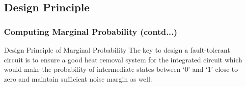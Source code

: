 \documentclass{beamer}
\begin{document}
\subsection{Design Principle}
\begin{frame}
\frametitle{Computing Marginal Probability (contd...)}
\begin{flushleft}
\begin{block}{Design Principle of Marginal Probability}
The key to design a fault-tolerant circuit is to ensure a good heat removal system for the integrated circuit which would make the probability of intermediate states between ‘0’ and ‘1’ close to zero and maintain sufficient noise margin as well.
\end{block}
\end{flushleft}
\end{frame}
\end{document}
